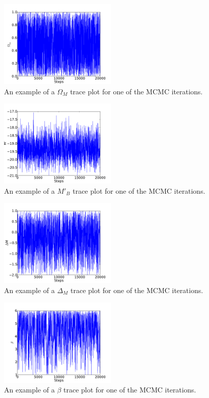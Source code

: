 \documentclass[aps,prl,reprint]{revtex4-1}
\begin{document}
\begin{figure}
 \includegraphics[width=0.5\textwidth]{../plots/om.pdf}
\caption{\label{fig:om}An example of a $\Omega_M$ trace plot for one of the MCMC iterations.}
\end{figure}
\begin{figure}
 \includegraphics[width=0.5\textwidth]{../plots/Mp.pdf}
\caption{\label{fig:mp}An example of a  $M'_B$ trace plot for one of the MCMC iterations.}
\end{figure}
\begin{figure}
 \includegraphics[width=0.5\textwidth]{../plots/dM.pdf}
\caption{\label{fig:dm}An example of a  $\Delta_M$ trace plot for one of the MCMC iterations.}
\end{figure}
\begin{figure}
 \includegraphics[width=0.5\textwidth]{../plots/beta.pdf}
\caption{\label{fig:beta}An example of a  $\beta$ trace plot for one of the MCMC iterations.}
\end{figure}
\end{document}
